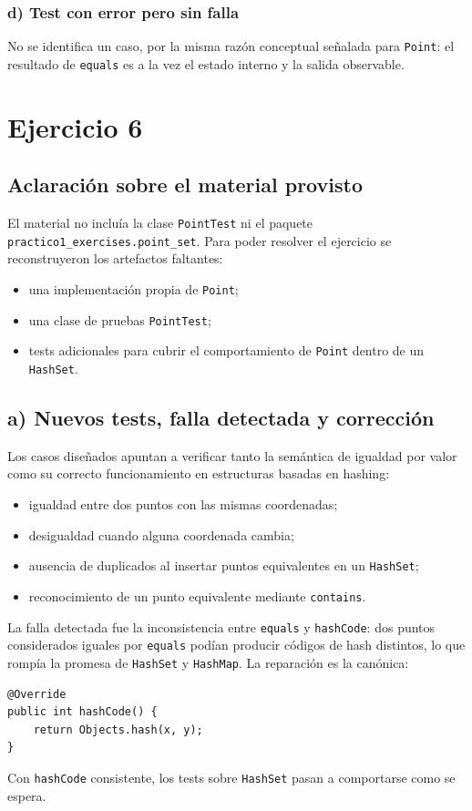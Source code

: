 \documentclass[12pt,a4paper]{article}
\begin{document}
\subsubsection*{d) Test con error pero sin falla}
No se identifica un caso, por la misma razón conceptual señalada para \texttt{Point}: el resultado de \texttt{equals} es a la vez el estado interno y la salida observable.

\section{Ejercicio 6}
\subsection{Aclaración sobre el material provisto}
El material no incluía la clase \texttt{PointTest} ni el paquete \texttt{practico1\_exercises.point\_set}. Para poder resolver el ejercicio se reconstruyeron los artefactos faltantes:
\begin{itemize}
  \item una implementación propia de \texttt{Point};
  \item una clase de pruebas \texttt{PointTest};
  \item tests adicionales para cubrir el comportamiento de \texttt{Point} dentro de un \texttt{HashSet}.
\end{itemize}

\subsection{a) Nuevos tests, falla detectada y corrección}
Los casos diseñados apuntan a verificar tanto la semántica de igualdad por valor como su correcto funcionamiento en estructuras basadas en hashing:
\begin{itemize}
  \item igualdad entre dos puntos con las mismas coordenadas;
  \item desigualdad cuando alguna coordenada cambia;
  \item ausencia de duplicados al insertar puntos equivalentes en un \texttt{HashSet};
  \item reconocimiento de un punto equivalente mediante \texttt{contains}.
\end{itemize}

La falla detectada fue la inconsistencia entre \texttt{equals} y \texttt{hashCode}: dos puntos considerados iguales por \texttt{equals} podían producir códigos de hash distintos, lo que rompía la promesa de \texttt{HashSet} y \texttt{HashMap}. La reparación es la canónica:
\begin{lstlisting}[style=javastyle]
@Override
public int hashCode() {
    return Objects.hash(x, y);
}
\end{lstlisting}
Con \texttt{hashCode} consistente, los tests sobre \texttt{HashSet} pasan a comportarse como se espera.
\end{document}
